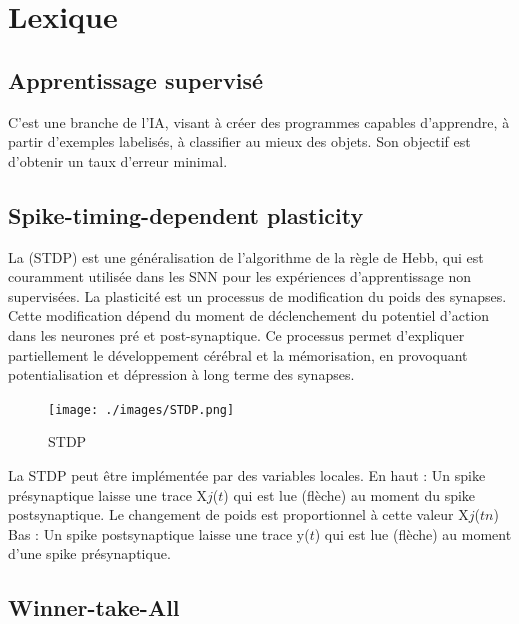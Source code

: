 \hypertarget{lexique}{%
\chapter{Lexique}\label{lexique}}

\hypertarget{apprentissage-supervisuxe9}{%
\section{Apprentissage supervisé}\label{apprentissage-supervisuxe9}}

C'est une branche de l'IA, visant à créer des programmes capables
d'apprendre, à partir d'exemples labelisés, à classifier au mieux des
objets. Son objectif est d'obtenir un taux d'erreur minimal.

\hypertarget{spike-timing-dependent-plasticity}{%
\section{Spike-timing-dependent
plasticity}\label{spike-timing-dependent-plasticity}}

La (STDP) est une généralisation de l'algorithme de la règle de Hebb,
qui est couramment utilisée dans les SNN pour les expériences
d'apprentissage non supervisées. La plasticité est un processus de
modification du poids des synapses. Cette modification dépend du moment
de déclenchement du potentiel d'action dans les neurones pré et
post-synaptique. Ce processus permet d'expliquer partiellement le
développement cérébral et la mémorisation, en provoquant
potentialisation et dépression à long terme des synapses.

\begin{figure}[!h]
\centering
\texttt{[image: ./images/STDP.png]}
\caption{STDP}
\end{figure}

La STDP peut être implémentée par des variables locales. En haut : Un
spike présynaptique laisse une trace X\(j\)(\(t\)) qui est lue (flèche)
au moment du spike postsynaptique. Le changement de poids est
proportionnel à cette valeur X\(j\)(\(tn\)) Bas : Un spike
postsynaptique laisse une trace y(\(t\)) qui est lue (flèche) au moment
d'une spike présynaptique.

\hypertarget{winner-take-all}{%
\section{Winner-take-All}\label{winner-take-all}}

